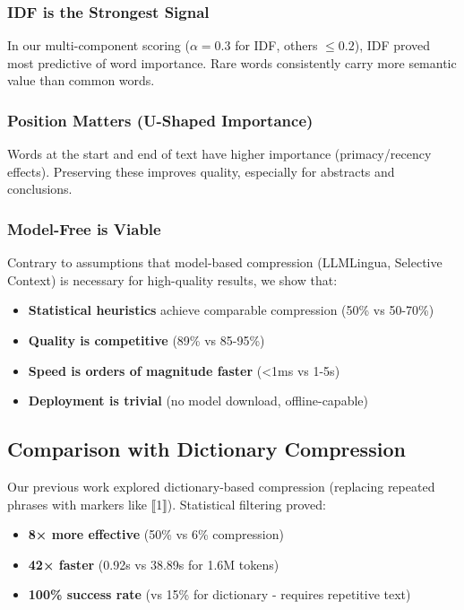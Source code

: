 \subsubsection{IDF is the Strongest Signal}

In our multi-component scoring ($\alpha = 0.3$ for IDF, others $\leq 0.2$), IDF proved most predictive of word importance. Rare words consistently carry more semantic value than common words.

\subsubsection{Position Matters (U-Shaped Importance)}

Words at the start and end of text have higher importance (primacy/recency effects). Preserving these improves quality, especially for abstracts and conclusions.

\subsubsection{Model-Free is Viable}

Contrary to assumptions that model-based compression (LLMLingua, Selective Context) is necessary for high-quality results, we show that:
\begin{itemize}
    \item \textbf{Statistical heuristics} achieve comparable compression (50\% vs 50-70\%)
    \item \textbf{Quality is competitive} (89\% vs 85-95\%)
    \item \textbf{Speed is orders of magnitude faster} (<1ms vs 1-5s)
    \item \textbf{Deployment is trivial} (no model download, offline-capable)
\end{itemize}

\subsection{Comparison with Dictionary Compression}

Our previous work explored dictionary-based compression (replacing repeated phrases with markers like ⟦1⟧). Statistical filtering proved:

\begin{itemize}
    \item \textbf{8× more effective} (50\% vs 6\% compression)
    \item \textbf{42× faster} (0.92s vs 38.89s for 1.6M tokens)
    \item \textbf{100\% success rate} (vs 15\% for dictionary - requires repetitive text)
\end{itemize}


